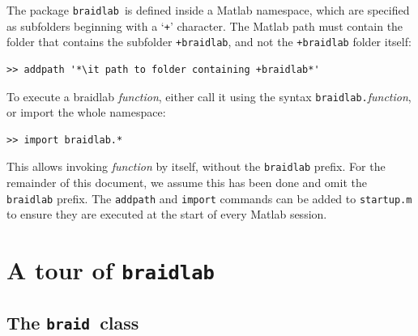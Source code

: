 \documentclass[12pt]{article}
\newcommand{\braidlab}{\texttt{braidlab}}%
\newcommand{\braid}{\texttt{braid}}%
\begin{document}
The package \braidlab\ is defined inside a Matlab namespace, which are
specified as subfolders beginning with a `\lstinline{+}' character.  The Matlab
path must contain the folder that contains the subfolder
\lstinline{+braidlab}, and not the \lstinline{+braidlab} folder
itself:
\begin{lstlisting}[frame=single,framerule=0pt,escapechar=*]
>> addpath '*\it path to folder containing +braidlab*'
\end{lstlisting}
To execute a braidlab \textit{function}, either call it using the
syntax \hbox{\lstinline{braidlab.}\textit{function}}, or import the
whole namespace:
\begin{lstlisting}[frame=single,framerule=0pt]
>> import braidlab.*
\end{lstlisting}
This allows invoking \textit{function} by itself, without the
\lstinline{braidlab} prefix.  For the remainder of this document, we
assume this has been done and omit the \lstinline{braidlab} prefix.
The \lstinline{addpath} and \lstinline{import} commands can be added
to \lstinline{startup.m} to ensure they are executed at the start of
every Matlab session.


\section{A tour of \braidlab}
\label{sec:tour}

\subsection{The \braid\ class}
\label{sec:braidclass}
\end{document}
